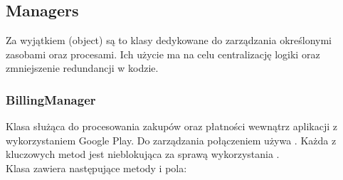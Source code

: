 \newpage

\subsection{Managers}
Za wyjątkiem  (object) są to klasy dedykowane do zarządzania określonymi zasobami oraz procesami. Ich użycie ma na celu centralizację logiki oraz zmniejszenie redundancji w kodzie.

\subsubsection{BillingManager}
Klasa służąca do procesowania zakupów oraz płatności wewnątrz aplikacji z wykorzystaniem Google Play. Do zarządzania połączeniem używa . Każda z kluczowych metod jest nieblokująca za sprawą wykorzystania .\\

Klasa  zawiera następujące metody i pola:

